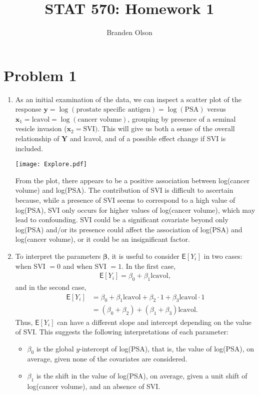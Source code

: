 \documentclass[11pt]{article}
\newcommand*\ba{\[ \begin{aligned}}
\newcommand*\ea{\end{aligned} \]}
\newcommand*\E[1]{\mathsf{E}\left[#1\right]}
\newcommand*\bx{\mathbf{x}}
\newcommand*\by{\mathbf{y}}
\newcommand*\bY{\mathbf{Y}}
\newcommand*\bbeta{\boldsymbol{\beta}}
\renewcommand\;{\,}
\begin{document}
\title{STAT 570: Homework 1}
\author{Branden Olson}
\date{}
\maketitle

\section*{Problem 1}

\begin{enumerate}[label=(\alph*)]
\item
As an initial examination of the data, we can inspect a scatter plot of the response $\by = \log(\text{prostate specific antigen}) = \log(\text{PSA})$ versus 
$\bx_1 = \text{lcavol} = \log(\text{cancer volume})$, grouping by presence of a seminal vesicle invasion ($\bx_2 = \text{SVI})$. This will give us both a sense of the overall relationship of $\bY$ and lcavol, and of a possible effect change if SVI is included.
\begin{center}
\texttt{[image: Explore.pdf]}
\end{center}
From the plot, there appears to be a positive association between log(cancer volume) and log(PSA). The contribution of SVI is difficult to ascertain because, while a presence of SVI seems to correspond to a high value of log(PSA), SVI only occurs for higher values of log(cancer volume), which may lead to confounding. SVI could be a significant covariate beyond only log(PSA) and/or its presence could affect the association of log(PSA) and log(cancer volume), or it could be an insignificant factor.
\item
To interpret the parameters $\bbeta$, it is useful to consider 
$\E{Y_i}$ in two cases: when SVI $= 0$ and when SVI $=1$. In the first case,
\ba
\E{Y_i} = \beta_0 + \beta_1 \text{lcavol},
\ea
and in the second case,
\ba
\E{Y_i} & = \beta_0 + \beta_1 \text{lcavol} + \beta_2 \cdot 1 + \beta_3 \text{lcavol} \cdot 1 \\
	& = (\beta_0 + \beta_2) + (\beta_1 + \beta_3) \text{lcavol}.
\ea
Thus, $\E{Y_i}$ can have a different slope and intercept depending on the value of SVI. This suggests the following interpretations of each parameter:
\begin{itemize}
\item $\beta_0$ is the global $y$-intercept of log(PSA), that is, the value of log(PSA), on average, given none of the covariates are considered.
\item $\beta_1$ is the shift in the value of log(PSA), on average, given a unit shift of log(cancer volume), and an absence of SVI.

\end{itemize}
\end{enumerate}
\end{document}
